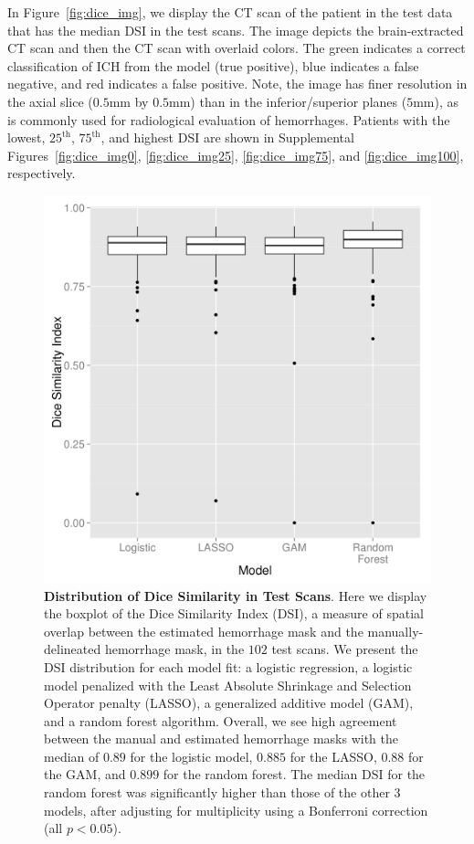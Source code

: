 \documentclass{elsarticle_nonatbib}\usepackage[]{graphicx}\usepackage[]{color}
\begin{document}
In Figure~\ref{fig:dice_img}, we display the CT scan of the patient in the test data that has the median DSI in the test scans. The image depicts the brain-extracted CT scan and then the CT scan with overlaid colors.  The green indicates a correct classification of ICH from the model (true positive), blue indicates a false negative, and red indicates a false positive.  Note, the image has finer resolution in the axial slice ($0.5$mm by $0.5$mm) than in the inferior/superior planes ($5$mm), as is commonly used for radiological evaluation of hemorrhages.  Patients with the lowest, $25^{\text{th}}$, $75^{\text{th}}$, and highest DSI are shown in Supplemental Figures~\ref{fig:dice_img0}, \ref{fig:dice_img25}, \ref{fig:dice_img75}, and \ref{fig:dice_img100}, respectively.



\begin{figure}
\centering
\includegraphics[width=0.75\linewidth,keepaspectratio]{Reseg_Dice_Comparison.png}
\caption{{\bf Distribution of Dice Similarity in Test Scans}.  Here we display the boxplot of the Dice Similarity Index (DSI), a measure of spatial overlap between the estimated hemorrhage mask and the manually-delineated hemorrhage mask, in the $102$ test scans.  We present the DSI distribution for each model fit: a logistic regression, a logistic model penalized with the Least Absolute Shrinkage and Selection Operator penalty (LASSO), a generalized additive model (GAM), and a random forest algorithm.  Overall, we see high agreement between the manual and estimated hemorrhage masks with the median of $0.89$ for the logistic model, $0.885$ for the LASSO, $0.88$ for the GAM, and $0.899$ for the random forest. The median DSI for the random forest was significantly higher than those of the other 3 models, after adjusting for multiplicity using a Bonferroni correction (all $p < 0.05$).   }
\label{fig:dice}
\end{figure}
\end{document}
